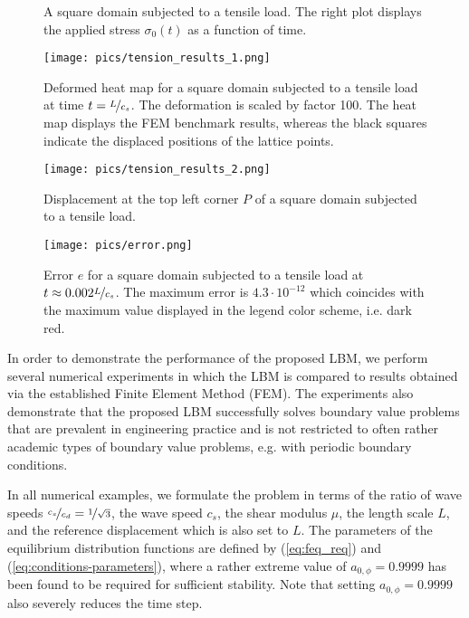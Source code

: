 \documentclass{article}
\begin{document}
\begin{figure}[htb]
    \centering
    
    \caption{A square domain subjected to a tensile load. The right plot displays the applied stress $\sigma_{0}(t)$ as a function of time.}
    \label{fig:tension_setup}
\end{figure}

\begin{figure}[htb]
    \centering
    \texttt{[image: pics/tension\_results\_1.png]}
    \caption{Deformed heat map for a square domain subjected to a tensile load  at time $t=\nicefrac{L}{c_s}$. The deformation is scaled by factor 100. The heat map displays the FEM benchmark results, whereas the black squares indicate the displaced positions of the lattice points.}
    \label{fig:tension_results_1}
\end{figure}

\begin{figure*}[htb]
    \centering
    \texttt{[image: pics/tension\_results\_2.png]}
    \caption{Displacement at the top left corner $P$ of a square domain subjected to a tensile load.}
    \label{fig:tension_results_2}
\end{figure*}

\begin{figure}[htb]
    \centering
    \texttt{[image: pics/error.png]}
    \caption{Error $e$ for a square domain subjected to a tensile load at $t\approx0.002\nicefrac{L}{c_s}$. The maximum error is $4.3 \cdot 10^{-12}$ which coincides with the maximum value displayed in the legend color scheme, i.e. dark red.}
    \label{fig:error}
\end{figure}


In order to demonstrate the performance of the proposed LBM, we perform several numerical experiments in which the LBM is compared to results obtained via the established Finite Element Method (FEM). The experiments also demonstrate that the proposed LBM successfully solves boundary value problems that are prevalent in engineering practice and is not restricted to  often rather academic types of boundary value problems, e.g. with periodic boundary conditions.

In all numerical examples, we formulate the problem in terms of  the ratio of wave speeds $\nicefrac{c_s}{c_d}=\nicefrac{1}{\sqrt{3}}$, the wave speed $c_s$, the shear modulus $\mu$, the length scale $L$, and the reference displacement which is also set to $L$. The parameters of the equilibrium distribution functions are defined by (\ref{eq:feq_req}) and (\ref{eq:conditions-parameters}), where a rather extreme value of $a_{0,\phi}=0.9999$ has been found to be required for sufficient stability. Note that setting $a_{0,\phi}=0.9999$ also severely reduces the time step.
\end{document}
